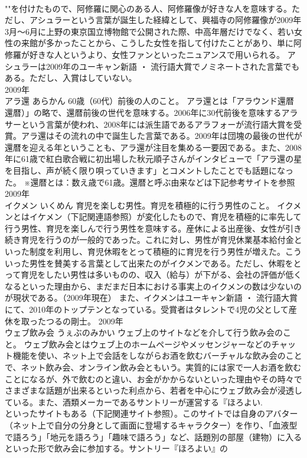 \documentclass[8pt]{extreport}
\begin{document}
\begin{CJK}{UTF8}{min}
\\	""を付けたもので、阿修羅に関心のある人、阿修羅像が好きな人を意味する。ただし、アシュラーという言葉が誕生した経緯として、興福寺の阿修羅像が2009年3月～6月に上野の東京国立博物館で公開された際、中高年層だけでなく、若い女性の来館が多かったことから、こうした女性を指して付けたことがあり、単に阿修羅が好きな人というより、女性ファンといったニュアンスで用いられる。 アシュラーは2009年のユーキャン新語 ・ 流行語大賞でノミネートされた言葉でもある。ただし、入賞はしていない。
\\	2009年	
\\	アラ還	あらかん	60歳（60代）前後の人のこと。	アラ還とは「アラウンド還暦
\\	還暦）」の略で、還暦前後の世代を意味する。2006年に30代前後を意味するアラサーという言葉が使われ、2008年には派生語であるアラフォーが流行語大賞を受賞。アラ還はその流れの中で誕生した言葉である。2009年は団塊の最後の世代が還暦を迎える年ということも、アラ還が注目を集める一要因である。また、2008年に61歳で紅白歌合戦に初出場した秋元順子さんがインタビューで「アラ還の星を目指し、声が続く限り唄っていきます」とコメントしたことでも話題になった。 ※還暦とは：数え歳で61歳。還暦と呼ぶ由来などは下記参考サイトを参照	2009年	
\\	イクメン	いくめん	育児を楽しむ男性。育児を積極的に行う男性のこと。	イクメンとはイケメン（下記関連語参照）が変化したもので、育児を積極的に率先して行う男性、育児を楽しんで行う男性を意味する。産休による出産後、女性が引き続き育児を行うのが一般的であった。これに対し、男性が育児休業基本給付金といった制度を利用し、育児休暇をとって積極的に育児を行う男性が増えた。こういった男性を賛美する言葉として出来たのがイクメンである。ただし、休暇をとって育児をしたい男性は多いものの、収入（給与）が下がる、会社の評価が低くなるといった理由から、まだまだ日本における事実上のイクメンの数は少ないのが現状である。（2009年現在） また、イクメンはユーキャン新語 ・ 流行語大賞にて、2010年のトップテンとなっている。受賞者はタレントで4児の父として産休を取ったつるの剛士。	2009年	
\\	ウェブ飲み会	うぇぶのみかい	ウェブ上のサイトなどを介して行う飲み会のこと。	ウェブ飲み会とはウェブ上のホームページやメッセンジャーなどのチャット機能を使い、ネット上で会話をしながらお酒を飲むバーチャルな飲み会のことで、ネット飲み会、オンライン飲み会ともいう。実質的には家で一人お酒を飲むことになるが、外で飲むのと違い、お金がかからないといった理由やその時々でさまざまな話題が出来るといった利点から、若者を中心にウェブ飲み会が浸透している。また、酒類メーカーであるサントリーが運営する『ほろよい.
\\	といったサイトもある（下記関連サイト参照）。このサイトでは自身のアバター（ネット上で自分の分身として画面に登場するキャラクター）を作り、「血液型で語ろう」「地元を語ろう」「趣味で語ろう」など、話題別の部屋（建物）に入るといった形で飲み会に参加する。サントリー『ほろよい』の

\end{CJK}
\end{document}
